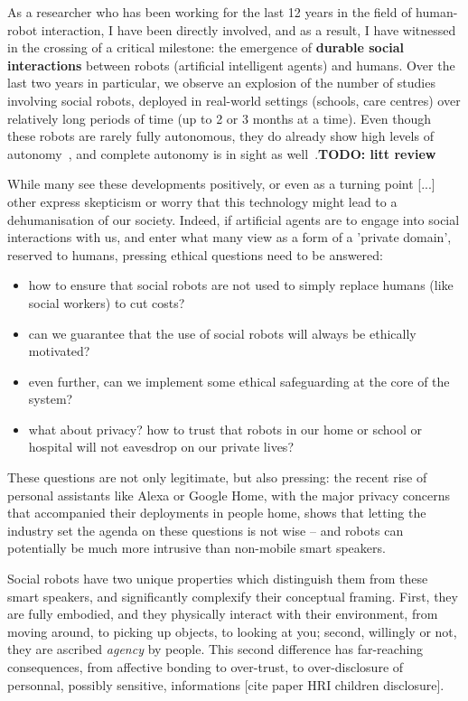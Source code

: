\documentclass[]{article}
\newcommand{\TODO}[1]{{\color{red}\textbf{TODO: #1}}}
\begin{document}
As a researcher who has been working for the last 12 years in the field of
human-robot interaction, I have been directly involved, and as a result, I have
witnessed in the crossing of a critical milestone: the emergence of
\textbf{durable social interactions} between robots (artificial intelligent
agents) and humans. Over the last two years in particular, we observe an
explosion of the number of studies involving social robots, deployed in
real-world settings (schools, care centres) over relatively long periods of time
(up to 2 or 3 months at a time). Even though these robots are rarely fully
autonomous, they do already show high levels of autonomy~\cite{emmanuel}, and complete autonomy
is in sight as well~\cite{strands}.\TODO{litt review}

While many see these developments positively, or even as a turning point [...]
other express skepticism or worry that this technology might lead to a
dehumanisation of our society. Indeed, if artificial agents are to engage into
social interactions with us, and enter what many view as a form of a 'private
domain', reserved to humans, pressing ethical questions need to be answered:

\begin{itemize}
    \item how to ensure that social robots are not used to simply replace humans
        (like social workers) to cut costs?
    \item can we guarantee that the use of social robots will always be ethically motivated?
    \item even further, can we implement some ethical safeguarding at the core
        of the system?
    \item what about privacy? how to trust that robots in our home or school or
        hospital will not eavesdrop on our private lives?
\end{itemize}

These questions are not only legitimate, but also pressing: the recent rise of
personal assistants like Alexa or Google Home, with the major privacy concerns
that accompanied their deployments in people home, shows that letting the
industry set the agenda on these questions is not wise -- and robots can
potentially be much more intrusive than non-mobile smart speakers.

Social robots have two unique properties which distinguish them from these smart
speakers, and significantly complexify their conceptual framing. First, they are
fully embodied, and they physically interact with their environment, from moving
around, to picking up objects, to looking at you; second, willingly or not, they
are ascribed \emph{agency} by people.  This second difference has far-reaching
consequences, from affective bonding to over-trust, to over-disclosure of
personnal, possibly sensitive, informations [cite paper HRI children
disclosure].
\end{document}
